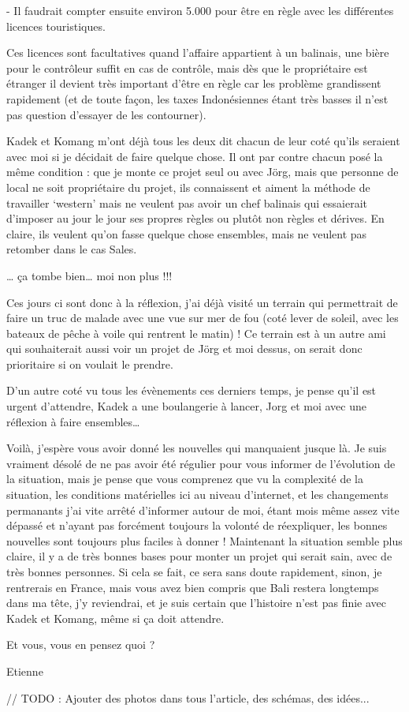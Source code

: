 \begin{multicols}{2}
- Il faudrait compter ensuite environ 5.000 pour être en règle avec les différentes licences touristiques.

Ces licences sont facultatives quand l’affaire appartient à un balinais, une bière pour le contrôleur suffit en cas de contrôle, mais dès que le propriétaire est étranger il devient très important d’être en règle car les problème grandissent rapidement (et de toute façon, les taxes Indonésiennes étant très basses il n’est pas question d’essayer de les contourner).

Kadek et Komang m’ont déjà tous les deux dit chacun de leur coté qu’ils seraient avec moi si je décidait de faire quelque chose. Il ont par contre chacun posé la même condition : que je monte ce projet seul ou avec Jörg, mais que personne de local ne soit propriétaire du projet, ils connaissent et aiment la méthode de travailler ‘western’ mais ne veulent pas avoir un chef balinais qui essaierait d’imposer au jour le jour ses propres règles ou plutôt non règles et dérives. En claire, ils veulent qu’on fasse quelque chose ensembles, mais ne veulent pas retomber dans le cas Sales.

… ça tombe bien… moi non plus !!!

Ces jours ci sont donc à la réflexion, j’ai déjà visité un terrain qui permettrait de faire un truc de malade avec une vue sur mer de fou (coté lever de soleil, avec les bateaux de pêche à voile qui rentrent le matin) ! Ce terrain est à un autre ami qui souhaiterait aussi voir un projet de Jörg et moi dessus, on serait donc prioritaire si on voulait le prendre.

D’un autre coté vu tous les évènements ces derniers temps, je pense qu’il est urgent d’attendre, Kadek a une boulangerie à lancer, Jorg et moi avec une réflexion à faire ensembles…

Voilà, j’espère vous avoir donné les nouvelles qui manquaient jusque là. Je suis vraiment désolé de ne pas avoir été régulier pour vous informer de l’évolution de la situation, mais je pense que vous comprenez que vu la complexité de la situation, les conditions matérielles ici au niveau d’internet, et les changements permanants j’ai vite arrêté d’informer autour de moi, étant mois même assez vite dépassé et n’ayant pas forcément toujours la volonté de réexpliquer, les bonnes nouvelles sont toujours plus faciles à donner ! Maintenant la situation semble plus claire, il y a de très bonnes bases pour monter un projet qui serait sain, avec de très bonnes personnes. Si cela se fait, ce sera sans doute rapidement, sinon, je rentrerais en France, mais vous avez bien compris que Bali restera longtemps dans ma tête, j’y reviendrai, et je suis certain que l’histoire n’est pas finie avec Kadek et Komang, même si ça doit attendre.

Et vous, vous en pensez quoi ?

Etienne

// TODO : Ajouter des photos dans tous l'article, des schémas, des idées...

\end{multicols}
